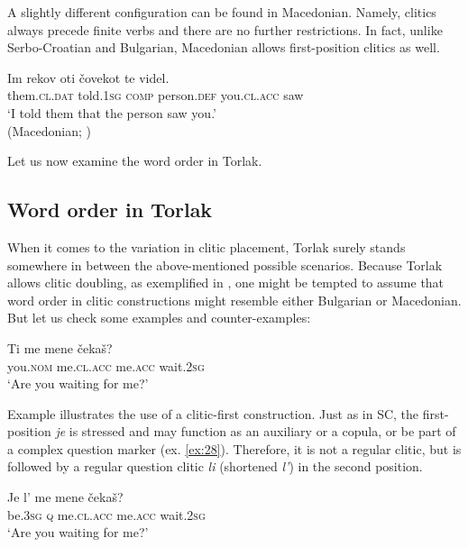 \documentclass[output=paper,
colorlinks,
citecolor=brown,
newtxmath
]{langscibook}
\begin{document}
\noindent A slightly different configuration can be found in Macedonian. Namely, clitics always precede finite verbs and there are no further restrictions. In fact, unlike Serbo-Croatian and Bulgarian, Macedonian allows first-position clitics as well.


\ea\label{ex:26}
\gll Im           rekov     oti čovekot     te         videl. \\
     them.\textsc{cl.dat}  told.\textsc{1sg}  \textsc{comp}   person.\textsc{def}  you.\textsc{cl.acc} saw\\
\glt `I told them that the person saw you.'\\
\hfill (Macedonian; \citealt[236]{Franks.King2000})
\z

\noindent Let us now examine the word order in Torlak.


\subsection{Word order in Torlak}
\label{subsec:orderTorlak}

When it comes to the variation in clitic placement, Torlak surely stands somewhere in between the above-mentioned possible scenarios. Because Torlak allows clitic doubling, as exemplified in , one might be tempted to assume that word order in clitic constructions might resemble either Bulgarian or Macedonian. But let us check some examples and counter-examples:


\ea\label{ex:27}
\gll Ti      me         mene    čekaš?\\
     you.\textsc{nom} me.\textsc{cl.acc}  me.\textsc{acc}  wait.\textsc{2sg} \\
\glt `Are you waiting for me?'
\z

\noindent Example  illustrates the use of a clitic-first construction. Just as in SC, the first-position \textit{je} is stressed and may function as an auxiliary or a copula, or be part of a complex question marker (ex. \ref{ex:28}). Therefore, it is not a regular clitic, but is followed by a regular question clitic \textit{li} (shortened \textit{l'}) in the second position.


\ea\label{ex:28}
\gll Je l’  me         mene    čekaš?\\
     be.\textsc{3sg} \textsc{q} me.\textsc{cl.acc}  me.\textsc{acc}  wait.\textsc{2sg} \\
\glt `Are you waiting for me?'
\z
\end{document}
